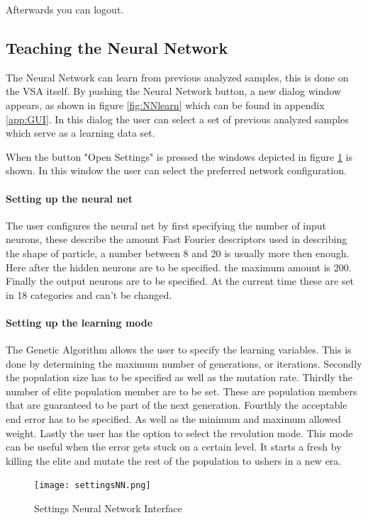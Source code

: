 \documentclass[11pt,fleqn,,a4paper,twoside,openright]{book}
\begin{document}
Afterwards you can logout.

\subsection{Teaching the Neural Network}
The Neural Network can learn from previous analyzed samples, this is done on the VSA itself. By pushing the Neural Network button, a new dialog window appears, as shown in figure \ref{fig:NNlearn} which can be found in appendix \ref{app:GUI}.  In this dialog the user can select a set of previous analyzed samples which serve as a learning data set.

When the button "Open Settings" is pressed the windows depicted in figure \ref{fig:NNsettings} is shown. In this window the user can select the preferred network configuration.
\paragraph{Setting up the neural net}
The user configures the neural net by first specifying the number of input neurons, these describe the amount Fast Fourier descriptors used in describing the shape of particle, a number between 8 and 20 is usually more then enough. Here after the hidden neurons are to be specified. the maximum amount is 200. Finally the output neurons are to be specified. At the current time these are set in 18 categories and can't be changed.

\paragraph{Setting up the learning mode}
The Genetic Algorithm allows the user to specify the learning variables. This is done by determining the maximum number of generations, or iterations. Secondly the population size has to be specified as well as the mutation rate. Thirdly the number of elite population member are to be set. These are population members that are guaranteed to be part of the next generation. Fourthly the acceptable end error has to be specified. As well as the minimum and maximum allowed weight. Lastly the user has the option to select the revolution mode. This mode can be useful when the error gets stuck on a certain level. It starts a fresh by killing the elite and mutate the rest of the population to ushers in a new era.

\begin{figure}[h]
	\texttt{[image: settingsNN.png]}
	\caption{Settings Neural Network Interface}\label{fig:NNsettings}
\end{figure}
\end{document}
